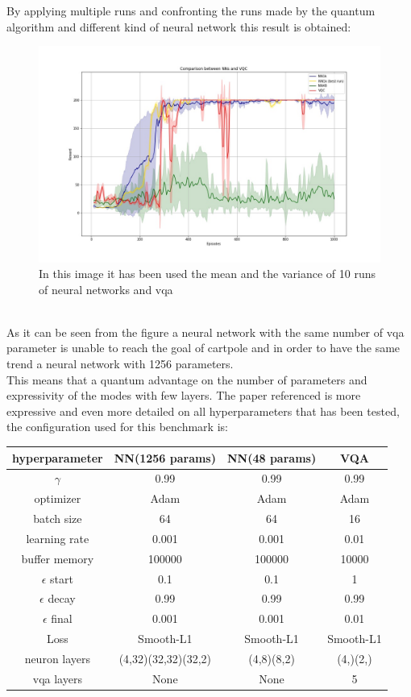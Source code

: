 By applying multiple runs and confronting the runs made by the quantum algorithm and different kind of neural network this result is obtained:
\begin{figure}[!h]
	\centering
	\includegraphics[width=\linewidth]{img/VQCNNcomparisonmedia}
	\caption[Benchmark of quantum and classical dqn]{In this image it has been used the mean and the variance of 10 runs of neural networks and vqa}
	\label{fig:vqcnncomparisonmedia}
\end{figure}\\
As it can be seen from the figure a neural network with the same number of vqa parameter is unable to reach the goal of cartpole and in order to have the same trend a neural network with 1256 parameters.\\
This means that a quantum advantage on the number of parameters and expressivity of the modes with few layers. The paper referenced is more expressive and even more detailed on all hyperparameters that has been tested, the configuration used for this benchmark is:
\begin{center}
	\begin{tabular}{|c|c|c|c|}
		\hline
		hyperparameter & NN(1256 params) & NN(48 params) & VQA \\
		\hline
		$\gamma$ & 0.99 & 0.99 & 0.99 \\
		\hline
		optimizer & Adam & Adam & Adam \\
		\hline
		batch size & 64 & 64  & 16 \\
		\hline
		learning rate & 0.001 & 0.001 & 0.01 \\
		\hline
		buffer memory & 100000 & 100000 & 10000 \\
		\hline
		$\epsilon$ start & 0.1 & 0.1 & 1 \\
		\hline
		$\epsilon$ decay & 0.99 & 0.99 & 0.99 \\
		\hline
		$\epsilon$ final & 0.001 & 0.001 & 0.01 \\
		\hline
		Loss & Smooth-L1 & Smooth-L1 & Smooth-L1 \\
		\hline
		neuron layers & (4,32)(32,32)(32,2) & (4,8)(8,2) & (4,)(2,)  \\
		\hline
		vqa layers & None & None & 5 \\
		\hline
	\end{tabular}
\end{center}
